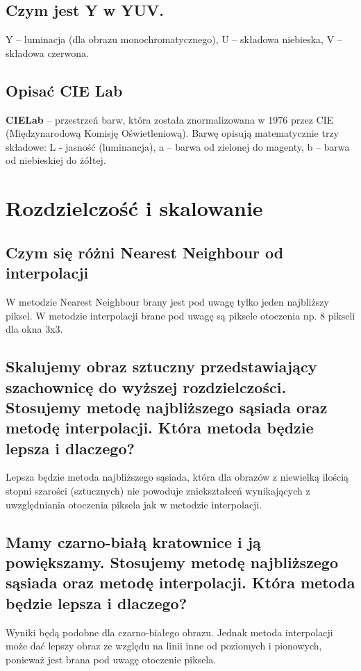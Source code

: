 \documentclass[a4paper, 12pt, titlepage]{article}
\begin{document}
\subsection{Czym jest Y w YUV.}
Y – luminacja (dla obrazu monochromatycznego), U – składowa niebieska, V – składowa czerwona.
\subsection{Opisać CIE Lab}
\textbf{CIELab} – przestrzeń barw, która została znormalizowana w 1976 przez CIE (Międzynarodową Komisję Oświetleniową). Barwę opisują matematycznie trzy składowe: L - jasność (luminancja), a – barwa od zielonej do magenty, b – barwa od niebieskiej do żółtej.
\pagebreak\section{Rozdzielczość i skalowanie}

\subsection{Czym się różni Nearest Neighbour od interpolacji}
W metodzie Nearest Neighbour brany jest pod uwagę tylko jeden najbliższy piksel. W metodzie interpolacji brane pod uwagę są piksele otoczenia np. 8 pikseli dla okna 3x3.

\subsection{Skalujemy obraz sztuczny przedstawiający szachownicę do wyższej rozdzielczości. Stosujemy metodę najbliższego sąsiada oraz metodę interpolacji. Która metoda będzie lepsza i dlaczego?}
Lepsza będzie metoda najbliższego sąsiada, która dla obrazów z niewielką ilością stopni szarości (sztucznych) nie powoduje zniekształceń wynikających z uwzględniania otoczenia piksela jak w metodzie interpolacji.

\subsection{Mamy czarno-białą kratownice i ją powiększamy. Stosujemy metodę najbliższego sąsiada oraz metodę interpolacji. Która metoda będzie lepsza i dlaczego?}
Wyniki będą podobne dla czarno-białego obrazu. Jednak metoda interpolacji może dać lepszy obraz ze względu na linii inne od poziomych i pionowych, ponieważ jest brana pod uwagę otoczenie piksela.
\end{document}

